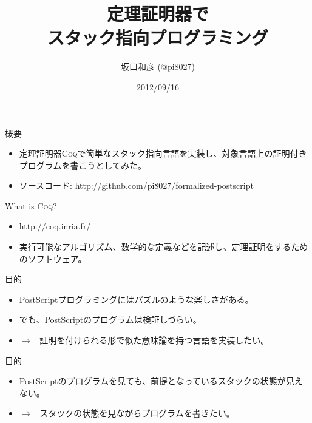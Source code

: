 \documentclass[cjk, 14pt]{beamer}
\title{定理証明器\Coq{}で\\スタック指向プログラミング}
\author{坂口和彦 (@pi8027)}
\institute{筑波大学 情報学群 情報科学類 B2}
\date{2012/09/16}
\newcommand{\Coq}{{\scshape{}Coq}}
\begin{document}
\begin{frame}[plain]

 \maketitle

\end{frame}

\begin{frame}{概要}

  \begin{itemize}
    \item 定理証明器\Coq{}で簡単なスタック指向言語を実装し、対象言語上の証明付きプログラムを書こうとしてみた。
    \item ソースコード: http://github.com/pi8027/formalized-postscript
  \end{itemize}

\end{frame}

\begin{frame}{What is \Coq?}

  \begin{itemize}
    \item http://coq.inria.fr/
    \item 実行可能なアルゴリズム、数学的な定義などを記述し、定理証明をするためのソフトウェア。
  \end{itemize}

\end{frame}

\begin{frame}{目的}

  \begin{itemize}
    \item PostScriptプログラミングにはパズルのような楽しさがある。
    \item でも、PostScriptのプログラムは検証しづらい。
    \item $\rightarrow$ \, 証明を付けられる形で似た意味論を持つ言語を実装したい。
  \end{itemize}

\end{frame}

\begin{frame}{目的}

  \begin{itemize}
    \item PostScriptのプログラムを見ても、前提となっているスタックの状態が見えない。
    \item $\rightarrow$ \, スタックの状態を見ながらプログラムを書きたい。
  \end{itemize}

\end{frame}
\end{document}
